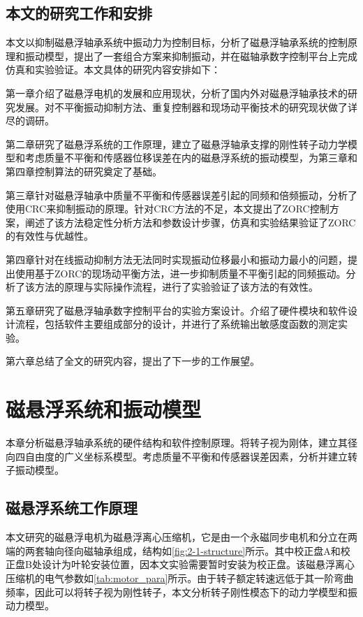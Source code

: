 \documentclass[
  lang=cn,
  degree=master,
  openany,oneside
]{nuaathesis}
\begin{document}
\section{本文的研究工作和安排}
本文以抑制磁悬浮轴承系统中振动力为控制目标，分析了磁悬浮轴承系统的控制原理和振动模型，提出了一套组合方案来抑制振动，并在磁轴承数字控制平台上完成仿真和实验验证。本文具体的研究内容安排如下：

第一章介绍了磁悬浮电机的发展和应用现状，分析了国内外对磁悬浮轴承技术的研究发展。对不平衡振动抑制方法、重复控制器和现场动平衡技术的研究现状做了详尽的调研。

第二章研究了磁悬浮系统的工作原理，建立了磁悬浮轴承支撑的刚性转子动力学模型和考虑质量不平衡和传感器位移误差在内的磁悬浮系统的振动模型，为第三章和第四章控制算法的研究奠定了基础。

第三章针对磁悬浮轴承中质量不平衡和传感器误差引起的同频和倍频振动，分析了使用CRC来抑制振动的原理。针对CRC方法的不足，本文提出了ZORC控制方案，阐述了该方法稳定性分析方法和参数设计步骤，仿真和实验结果验证了ZORC的有效性与优越性。

第四章针对在线振动抑制方法无法同时实现振动位移最小和振动力最小的问题，提出使用基于ZORC的现场动平衡方法，进一步抑制质量不平衡引起的同频振动。分析了该方法的原理与实际操作流程，进行了实验验证了该方法的有效性。

第五章研究了磁悬浮轴承数字控制平台的实验方案设计。介绍了硬件模块和软件设计流程，包括软件主要组成部分的设计，并进行了系统输出敏感度函数的测定实验。

第六章总结了全文的研究内容，提出了下一步的工作展望。

\chapter{磁悬浮系统和振动模型}
本章分析磁悬浮轴承系统的硬件结构和软件控制原理。将转子视为刚体，建立其径向四自由度的广义坐标系模型。考虑质量不平衡和传感器误差因素，分析并建立转子振动模型。

\section{磁悬浮系统工作原理}
本文研究的磁悬浮电机为磁悬浮离心压缩机，它是由一个永磁同步电机和分立在两端的两套轴向径向磁轴承组成，结构如\autoref{fig:2-1-structure}所示。其中校正盘A和校正盘B处设计为叶轮安装位置，因本文实验需要暂时安装为校正盘。该磁悬浮离心压缩机的电气参数如\autoref{tab:motor_para}所示。由于转子额定转速远低于其一阶弯曲频率，因此可以将转子视为刚性转子，本文分析转子刚性模态下的动力学模型和振动力模型。
\end{document}
